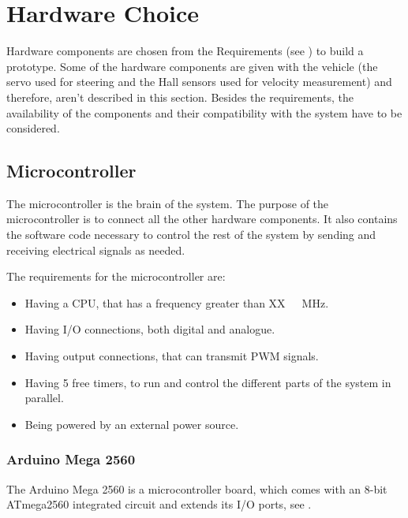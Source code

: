 \section{Hardware Choice} \label{Hardwarechoice}
Hardware components are chosen from the Requirements (see ) to build a prototype. 
Some of the hardware components are given with the vehicle (the servo used for steering and the Hall sensors used for velocity measurement) and therefore, aren't described in this section. 
Besides the requirements, the availability of the components and their compatibility with the system have to be considered.


\subsection{Microcontroller}
The microcontroller is the brain of the system. The purpose of the microcontroller is to connect all the other hardware components. It also contains the software code necessary to control the rest of the system by sending and receiving electrical signals as needed.

The requirements for the microcontroller are:
\begin{itemize}
\item Having a CPU, that has a frequency greater than \si{XX\ MHz}. 
\item Having I/O connections, both digital and analogue.
\item Having output connections, that can transmit PWM signals.
\item Having 5 free timers, to run and control the different parts of the system in parallel.
\item Being powered by an external power source.
\end{itemize}

\subsubsection{Arduino Mega 2560}
The Arduino Mega 2560 is a microcontroller board, which comes with an 8-bit ATmega2560 integrated circuit and extends its I/O ports, see  \cite{MegaInfo}. 

